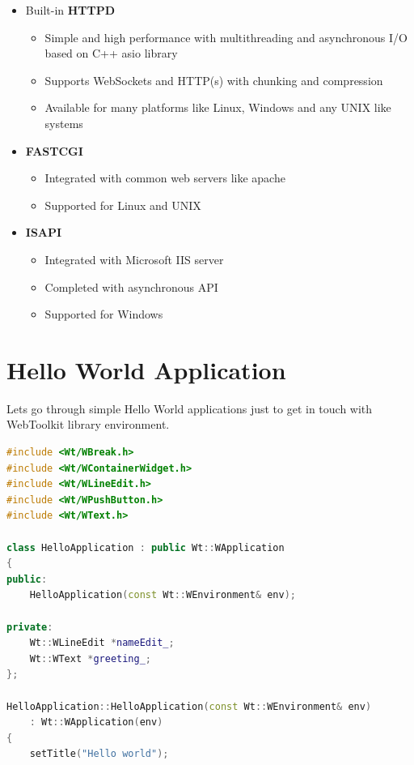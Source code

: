 \documentclass[a4paper,12pt]{book}
\begin{document}
{{{\begin{itemize}
	\item Built-in \textbf{HTTPD}
	\begin{itemize}
     \item Simple and high performance with multithreading and asynchronous I/O based on C++ asio library
     \item Supports WebSockets and HTTP(s) with chunking and compression
     \item Available for many platforms like Linux, Windows and any UNIX like systems
     \end{itemize}
	\item \textbf{FASTCGI}
	\begin{itemize}
     \item Integrated with common web servers like apache
     \item Supported for Linux and UNIX
     \end{itemize}
	\item \textbf{ISAPI}
	\begin{itemize}
     \item Integrated with Microsoft IIS server
     \item Completed with asynchronous API
     \item Supported for Windows
     \end{itemize}
\end{itemize}
}
\newpage
}

\section{Hello World Application}
{
Lets go through simple Hello World applications just to get in touch with WebToolkit library environment.

\begin{lstlisting}[frame=single, basicstyle=\small, language=C++, caption={A complete "Hello world" application \cite{helloworldapp}.}, captionpos=b]
#include <Wt/WBreak.h>
#include <Wt/WContainerWidget.h>
#include <Wt/WLineEdit.h>
#include <Wt/WPushButton.h>
#include <Wt/WText.h>

class HelloApplication : public Wt::WApplication
{
public:
    HelloApplication(const Wt::WEnvironment& env);

private:
    Wt::WLineEdit *nameEdit_;
    Wt::WText *greeting_;
};

HelloApplication::HelloApplication(const Wt::WEnvironment& env)
    : Wt::WApplication(env)
{
    setTitle("Hello world");


\end{lstlisting}}}
\end{document}
